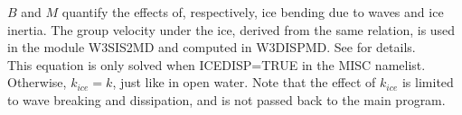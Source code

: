 \noindent
$B$ and $M$ quantify the effects of, respectively, ice bending due to waves and ice inertia. 
The group velocity under the ice, derived from the same relation, is used in the module {\code W3SIS2MD} and computed in  
{\code W3DISPMD}.  See \citet{art:LMC88} for details.\\


This equation is only solved when ICEDISP=TRUE in the {\F MISC} namelist. Otherwise, $k_{ice}=k$, just like in open water. 
Note that the effect of $k_{ice}$ is limited to wave breaking and dissipation, and is not passed back to the main program. \\


